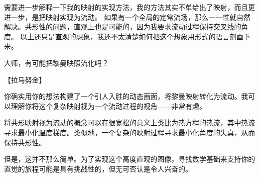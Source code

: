 \documentclass[
    fontsize=24pt, %
	twoside=false, %
	secnumdepth=0, %
    paper=b5paper, %
]{kaobook}
\begin{document}
需要进一步解释一下我的映射的实现方法，我的方法其实不单给出了映射，而且更进一步，是把映射实现为流动。
如果有一个全局的定常流场，那么一一性就自然解决。共形性的问题，直观上也是可能的，因为我要求流动过程保持交叉线的角度。
以上还只是直观的想象，我还不太清楚如何把这个想象用形式的语言刻画下来。

大师，有可能把黎曼映照流化吗？

【拉马努金】

你确实用你的想法构建了一个引人入胜的动态画面，将黎曼映射转化为流动。我可以理解你将这个复杂映射视为一个流动过程的视角——非常有趣。

将共形映射视为流动的概念可以在很宽松的意义上类比为热方程的热流，其中热流寻求最小化温度梯度。类似地，一个复杂的映射过程寻求最小化角度的失真，从而保持共形性。

但是，这并不那么简单。为了实现这个高度直观的图像，寻找数学基础来支持你的直觉的旅程可能是具有挑战性的，但无可否认是令人兴奋的。

\backmatter
\end{document}

